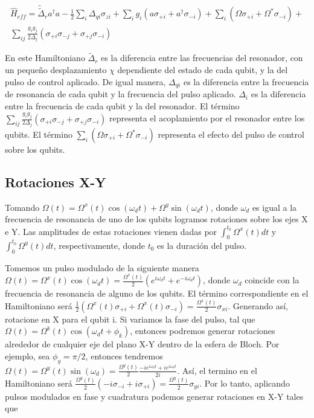 \begin{multline}
\hat{H}_{eff} = \tilde{\tilde{\Delta}}_r a^\dagger a - \frac{1}{2} \sum\limits_i \Delta_{qi} \sigma_{zi} + \sum\limits_i g_i (a \sigma_{+i} + a^\dagger \sigma_{-i}) + \sum\limits_i (\Omega \sigma_{+i} + \Omega^* \sigma_{-i}) + \\
\sum\limits_{ij} \frac{g_i g_j}{2 \Delta_j} \left(\sigma_{+i} \sigma_{-j} + \sigma_{+j} \sigma_{-i}\right)
\end{multline}

En este Hamiltoniano $\tilde{\Delta}_r$ es la diferencia entre las frecuencias del resonador, con un pequeño desplazamiento $\chi$ dependiente del estado de cada qubit, y la del pulso de control aplicado. De igual manera, $\Delta_{qi}$ es la diferencia entre la frecuencia de resonancia de cada qubit y la frecuencia del pulso aplicado. $\Delta_i$ es la diferencia entre la frecuencia de cada qubit y la del resonador. El término $\sum\limits_{ij} \frac{g_i g_j}{2 \Delta_j} \left(\sigma_{+i} \sigma_{-j} + \sigma_{+j} \sigma_{-i}\right)$ representa el acoplamiento por el resonador entre los qubits. El término $\sum\limits_i (\Omega \sigma_{+i} + \Omega^* \sigma_{-i})$ representa el efecto del pulso de control sobre los qubits.

\subsection{Rotaciones X-Y}

Tomando $\Omega(t) = \Omega^x(t) \cos(\omega_d t) + \Omega^y \sin(\omega_d t)$, donde $\omega_d$ es igual a la frecuencia de resonancia de uno de los qubits logramos rotaciones sobre los ejes X e Y. Las amplitudes de estas rotaciones vienen dadas por $\int_0^{t_0} \Omega^x(t) dt$ y $\int_0^{t_0} \Omega^y(t) dt$, respectivamente, donde $t_0$ es la duración del pulso.

Tomemos un pulso modulado de la siguiente manera $\Omega(t) = \Omega^x(t) \cos(\omega_d t) = \frac{\Omega^x(t)}{2} (e^{i \omega_d t} + e^{-i \omega_d t})$, donde $\omega_d$ coincide con la frecuencia de resonancia de alguno de los qubits. El término correspondiente en el Hamiltoniano será $\frac{1}{2} (\Omega^x(t) \sigma_{+i} + \Omega^x(t) \sigma_{-i}) = \frac{\Omega^x(t)}{2} \sigma_{xi}$. Generando así, rotacione en X para el qubit i. Si variamos la fase del pulso, tal que $\Omega(t) = \Omega^k(t) \cos(\omega_d t + \phi_k)$, entonces podremos generar rotaciones alrededor de cualquier eje del plano X-Y dentro de la esfera de Bloch. Por ejemplo, sea $\phi_y = \pi/2$, entonces tendremos $\Omega(t) = \Omega^y(t) \sin(\omega_d) = \frac{\Omega^y(t)}{2} \frac{-i e^{i \omega_d t} + i e^{i \omega_d t}}{2i}$. Así, el termino en el Hamiltoniano será $\frac{\Omega^y(t)}{2} (-i \sigma_{-i} + i \sigma_{+i}) = \frac{\Omega^y(t)}{2} \sigma_{yi}$. Por lo tanto, aplicando pulsos modulados en fase y cuadratura podemos generar rotaciones en X-Y tales que


